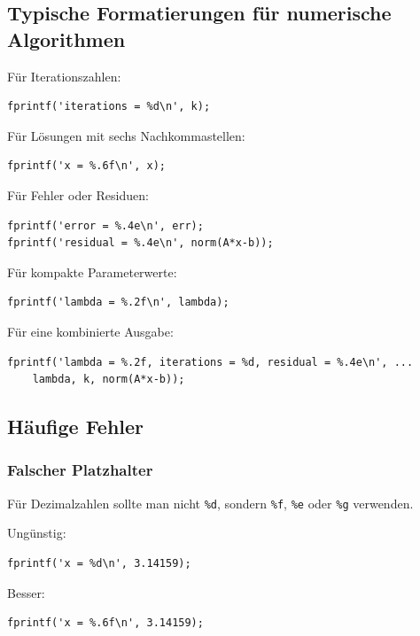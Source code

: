 \documentclass[10pt, letterpaper]{article}
\begin{document}
\subsection{Typische Formatierungen für numerische Algorithmen}

Für Iterationszahlen:

\begin{verbatim}
fprintf('iterations = %d\n', k);
\end{verbatim}

Für Lösungen mit sechs Nachkommastellen:

\begin{verbatim}
fprintf('x = %.6f\n', x);
\end{verbatim}

Für Fehler oder Residuen:

\begin{verbatim}
fprintf('error = %.4e\n', err);
fprintf('residual = %.4e\n', norm(A*x-b));
\end{verbatim}

Für kompakte Parameterwerte:

\begin{verbatim}
fprintf('lambda = %.2f\n', lambda);
\end{verbatim}

Für eine kombinierte Ausgabe:

\begin{verbatim}
fprintf('lambda = %.2f, iterations = %d, residual = %.4e\n', ...
    lambda, k, norm(A*x-b));
\end{verbatim}

\subsection{Häufige Fehler}

\subsubsection{Falscher Platzhalter}

Für Dezimalzahlen sollte man nicht \texttt{\%d}, sondern \texttt{\%f}, \texttt{\%e} oder \texttt{\%g} verwenden.

Ungünstig:

\begin{verbatim}
fprintf('x = %d\n', 3.14159);
\end{verbatim}

Besser:

\begin{verbatim}
fprintf('x = %.6f\n', 3.14159);
\end{verbatim}
\end{document}
